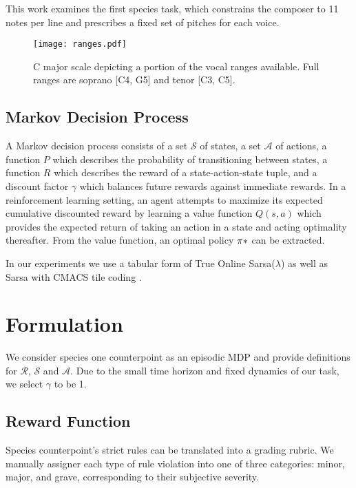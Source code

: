 \documentclass{article}
\begin{document}
    This work examines the first species task, which constrains the composer to 11 notes per line and prescribes a fixed set of pitches for each voice.
    \begin{figure}
        \texttt{[image: ranges.pdf]}
        \caption{C major scale depicting a portion of the vocal ranges available. Full ranges are soprano [C4, G5] and tenor [C3, C5].}
    \end{figure}
    
    \subsection{Markov Decision Process}
    A Markov decision process consists of a set $\mathcal{S}$ of states, a set $\mathcal{A}$ of actions, a function $P$ which describes the probability of transitioning between states, a function $R$ which describes the reward of a state-action-state tuple, and a discount factor $\gamma$ which balances future rewards against immediate rewards. In a reinforcement learning setting, an agent attempts to maximize its expected cumulative discounted reward by learning a value function $Q(s,a)$ which provides the expected return of taking an action in a state and acting optimality thereafter. From the value function, an optimal policy $\pi\/*$ can be extracted.
    
    In our experiments we use a tabular form of True Online Sarsa($\lambda$) as well as Sarsa with CMACS tile coding \cite{VanSeijen2016}\cite{Singh1996}\cite{Sutton1998}. 
 
 
    \section{Formulation}
    
    We consider species one counterpoint as an episodic MDP and provide definitions for $\mathcal{R}$, $\mathcal{S}$ and $\mathcal{A}$. Due to the small time horizon and fixed dynamics of our task, we select $\gamma$ to be 1.
    
    \subsection{Reward Function}
    Species counterpoint's strict rules can be translated into a grading rubric. We manually assigner each type of rule violation into one of three categories: minor, major, and grave, corresponding to their subjective severity. 
    
\end{document}
